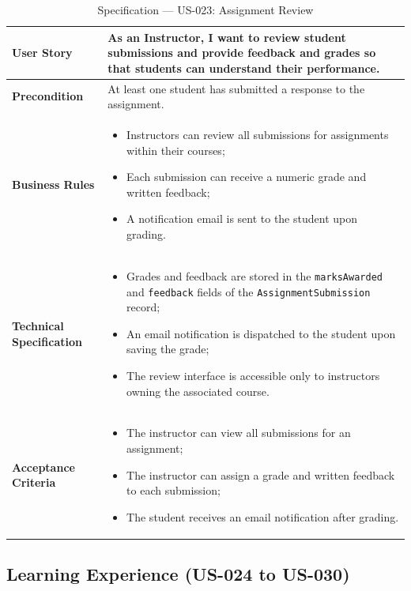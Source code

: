 \begin{table}[H]
\centering
\caption{Specification — US-023: Assignment Review}
\label{tab:us023}
\renewcommand{\arraystretch}{1.2}
\begin{tabularx}{\textwidth}{|p{3.5cm}|X|}
\hline
\textbf{User Story} & As an Instructor, I want to review student submissions and provide feedback and grades so that students can understand their performance. \\
\hline
\textbf{Precondition} & At least one student has submitted a response to the assignment. \\
\hline
\textbf{Business Rules} &
\begin{itemize}[noitemsep, topsep=2pt]
  \item Instructors can review all submissions for assignments within their courses;
  \item Each submission can receive a numeric grade and written feedback;
  \item A notification email is sent to the student upon grading.
\end{itemize} \\
\hline
\textbf{Technical Specification} &
\begin{itemize}[noitemsep, topsep=2pt]
  \item Grades and feedback are stored in the \texttt{marksAwarded} and \texttt{feedback} fields of the \texttt{AssignmentSubmission} record;
  \item An email notification is dispatched to the student upon saving the grade;
  \item The review interface is accessible only to instructors owning the associated course.
\end{itemize} \\
\hline
\textbf{Acceptance Criteria} &
\begin{itemize}[noitemsep, topsep=2pt]
  \item The instructor can view all submissions for an assignment;
  \item The instructor can assign a grade and written feedback to each submission;
  \item The student receives an email notification after grading.
\end{itemize} \\
\hline
\end{tabularx}
\end{table}

\subsection{Learning Experience (US-024 to US-030)}

